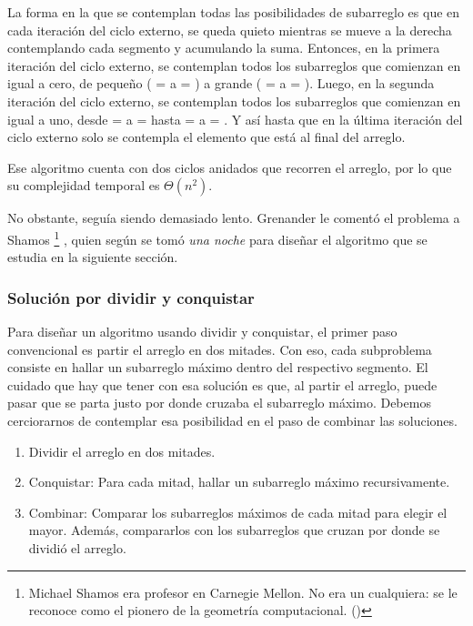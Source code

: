 La forma en la que se contemplan todas las posibilidades de subarreglo es que en cada iteración del ciclo externo,  se queda quieto mientras  se mueve a la derecha contemplando cada segmento y acumulando la suma. Entonces, en la primera iteración del ciclo externo, se contemplan todos los subarreglos que comienzan en  igual a cero, de pequeño ( =  a  = ) a grande ( =  a  = ). Luego, en la segunda iteración del ciclo externo, se contemplan todos los subarreglos que comienzan en  igual a uno, desde  =  a  =  hasta  =  a  = . Y así hasta que en la última iteración del ciclo externo solo se contempla el elemento que está al final del arreglo.

Ese algoritmo cuenta con dos ciclos anidados que recorren el arreglo, por lo que su complejidad temporal es \(\Theta(n^2)\). 

No obstante, seguía siendo demasiado lento. Grenander le comentó el problema a Shamos%
\footnote{Michael Shamos era profesor en Carnegie Mellon. No era un cualquiera: se le reconoce como el pionero de la geometría computacional. (\cite{shamos_cmu})
}%
, quien según \textcite{bentley} se tomó \emph{una noche} para diseñar el algoritmo que se estudia en la siguiente sección.

\subsubsection{Solución por dividir y conquistar}
\label{sec:subarreglo_max_divide_conquer}

Para diseñar un algoritmo usando dividir y conquistar, el primer paso convencional es partir el arreglo en dos mitades. Con eso, cada subproblema consiste en hallar un subarreglo máximo dentro del respectivo segmento. El cuidado que hay que tener con esa solución es que, al partir el arreglo, puede pasar que se parta justo por donde cruzaba el subarreglo máximo. Debemos cerciorarnos de contemplar esa posibilidad en el paso de combinar las soluciones.
\begin{enumerate}
    \item Dividir el arreglo en dos mitades.
    \item Conquistar: Para cada mitad, hallar un subarreglo máximo recursivamente.
    \item Combinar: Comparar los subarreglos máximos de cada mitad para elegir el mayor. Además, compararlos con los subarreglos que cruzan por donde se dividió el arreglo.
\end{enumerate}

